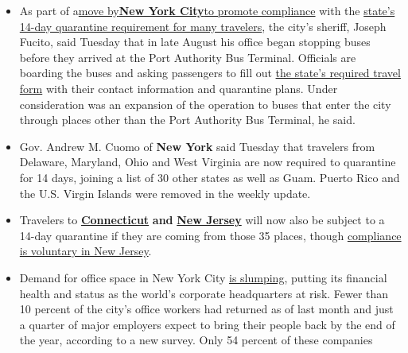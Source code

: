 \begin{itemize}
\item
  As part of
  a\href{https://www.nytimes3xbfgragh.onion/2020/08/05/nyregion/nyc-coronavirus-quarantine-checkpoints.html}{move
  by}\textbf{\href{https://www.nytimes3xbfgragh.onion/2020/08/05/nyregion/nyc-coronavirus-quarantine-checkpoints.html}{New
  York
  City}}\href{https://www.nytimes3xbfgragh.onion/2020/08/05/nyregion/nyc-coronavirus-quarantine-checkpoints.html}{to
  promote compliance} with the
  \href{https://coronavirus.health.ny.gov/covid-19-travel-advisory}{state's
  14-day quarantine requirement for many travelers}, the city's sheriff,
  Joseph Fucito, said Tuesday that in late August his office began
  stopping buses before they arrived at the Port Authority Bus Terminal.
  Officials are boarding the buses and asking passengers to fill out
  \href{https://forms.ny.gov/s3/Welcome-to-New-York-State-Traveler-Health-Form}{the
  state's required travel form} with their contact information and
  quarantine plans. Under consideration was an expansion of the
  operation to buses that enter the city through places other than the
  Port Authority Bus Terminal, he said.
\item
  Gov. Andrew M. Cuomo of \textbf{New York} said Tuesday that travelers
  from Delaware, Maryland, Ohio and West Virginia are now required to
  quarantine for 14 days, joining a list of 30 other states as well as
  Guam. Puerto Rico and the U.S. Virgin Islands were removed in the
  weekly update.
\item
  Travelers to
  \textbf{\href{https://twitter.com/GovNedLamont/status/1303366003854839809}{Connecticut}}
  \textbf{and}
  \textbf{\href{https://twitter.com/GovMurphy/status/1303356016558571520}{New
  Jersey}} will now also be subject to a 14-day quarantine if they are
  coming from those 35 places, though
  \href{https://covid19.nj.gov/faqs/nj-information/travel-and-transportation/which-states-are-on-the-travel-advisory-list-are-there-travel-restrictions-to-or-from-new-jersey}{compliance
  is voluntary in New Jersey}.
\item
  Demand for office space in New York City
  \href{https://www.nytimes3xbfgragh.onion/2020/09/08/business/economy/new-york-office-space-coronavirus.html}{is
  slumping}, putting its financial health and status as the world's
  corporate headquarters at risk. Fewer than 10 percent of the city's
  office workers had returned as of last month and just a quarter of
  major employers expect to bring their people back by the end of the
  year, according to a new survey. Only 54 percent of these companies

\end{itemize}
